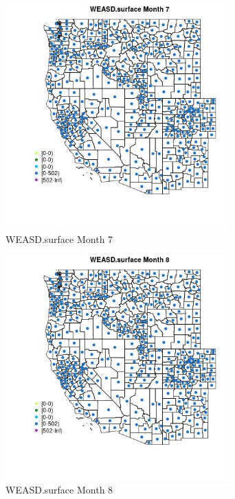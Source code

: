 \begin{figure} 
\centering  
\includegraphics[width=0.77\textwidth]{Code_Outputs/df_report_ML_predictors_CountyCentroid_Locations_Dates_2008-01-01to2018-12-31_MapObsMo7WEASDsurface.jpg} 
\caption{\label{fig:df_report_ML_predictors_CountyCentroid_Locations_Dates_2008-01-01to2018-12-31MapObsMo7WEASDsurface}WEASD.surface Month 7} 
\end{figure} 
 

\clearpage 

\begin{figure} 
\centering  
\includegraphics[width=0.77\textwidth]{Code_Outputs/df_report_ML_predictors_CountyCentroid_Locations_Dates_2008-01-01to2018-12-31_MapObsMo8WEASDsurface.jpg} 
\caption{\label{fig:df_report_ML_predictors_CountyCentroid_Locations_Dates_2008-01-01to2018-12-31MapObsMo8WEASDsurface}WEASD.surface Month 8} 
\end{figure} 
 

